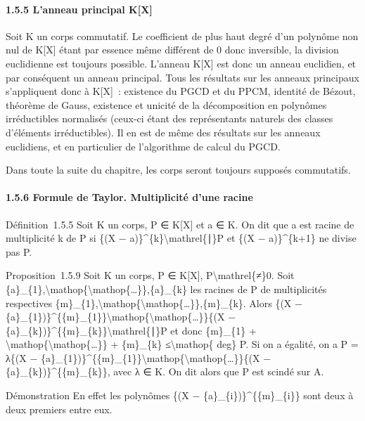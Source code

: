 \documentclass[]{article}
\begin{document}
\paragraph{1.5.5 L'anneau principal K{[}X{]}}

Soit K un corps commutatif. Le coefficient de plus haut degré d'un
polynôme non nul de K{[}X{]} étant par essence même différent de 0 donc
inversible, la division euclidienne est toujours possible. L'anneau
K{[}X{]} est donc un anneau euclidien, et par conséquent un anneau
principal. Tous les résultats sur les anneaux principaux s'appliquent
donc à K{[}X{]}~: existence du PGCD et du PPCM, identité de Bézout,
théorème de Gauss, existence et unicité de la décomposition en polynômes
irréductibles normalisés (ceux-ci étant des représentants naturels des
classes d'éléments irréductibles). Il en est de même des résultats sur
les anneaux euclidiens, et en particulier de l'algorithme de calcul du
PGCD.

Dans toute la suite du chapitre, les corps seront toujours supposés
commutatifs.

\paragraph{1.5.6 Formule de Taylor. Multiplicité d'une racine}

Définition~1.5.5 Soit K un corps, P ∈ K{[}X{]} et a ∈ K. On dit que a
est racine de multiplicité k de P si \{(X −
a)\}\^{}\{k\}\textbackslash{}mathrel\{∣\}P et \{(X − a)\}\^{}\{k+1\} ne
divise pas P.

Proposition~1.5.9 Soit K un corps, P ∈ K{[}X{]},
P\textbackslash{}mathrel\{≠\}0. Soit
\{a\}\_\{1\},\textbackslash{}mathop\{\textbackslash{}mathop\{\ldots{}\}\},\{a\}\_\{k\}
les racines de P de multiplicités respectives
\{m\}\_\{1\},\textbackslash{}mathop\{\textbackslash{}mathop\{\ldots{}\}\},\{m\}\_\{k\}.
Alors \{(X −
\{a\}\_\{1\})\}\^{}\{\{m\}\_\{1\}\}\textbackslash{}mathop\{\textbackslash{}mathop\{\ldots{}\}\}\{(X
− \{a\}\_\{k\})\}\^{}\{\{m\}\_\{k\}\}\textbackslash{}mathrel\{∣\}P et
donc \{m\}\_\{1\} +
\textbackslash{}mathop\{\textbackslash{}mathop\{\ldots{}\}\} +
\{m\}\_\{k\} ≤\textbackslash{}mathop\{ deg\} P. Si on a égalité, on a P
= λ\{(X −
\{a\}\_\{1\})\}\^{}\{\{m\}\_\{1\}\}\textbackslash{}mathop\{\textbackslash{}mathop\{\ldots{}\}\}\{(X
− \{a\}\_\{k\})\}\^{}\{\{m\}\_\{k\}\}, avec λ ∈ K. On dit alors que P
est scindé sur A.

Démonstration En effet les polynômes \{(X −
\{a\}\_\{i\})\}\^{}\{\{m\}\_\{i\}\} sont deux à deux premiers entre eux.
\end{document}
